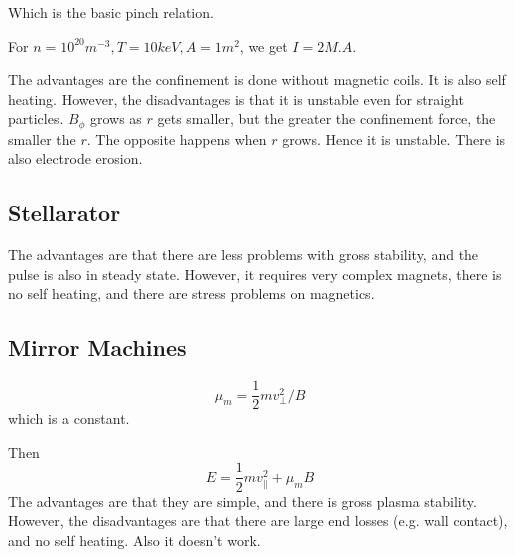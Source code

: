 \documentclass[12pt]{article}
\begin{document}
Which is the basic pinch relation.

\begin{ex}
    For $n = 10^{20}\unit{m^{-3}}, T = 10\unit{keV}, A = 1\unit{m^2}$, we get $I = 2\unit{M.A}$.
\end{ex}

The advantages are the confinement is done without magnetic coils. It is also self heating. However, the disadvantages is that it is unstable even for straight particles. $B_\phi$ grows as $r$ gets smaller, but the greater the confinement force, the smaller the $r$. The opposite happens when $r$ grows. Hence it is unstable. There is also electrode erosion.

\subsection{Stellarator}

The advantages are that there are less problems with gross stability, and the pulse is also in steady state. However, it requires very complex magnets, there is no self heating, and there are stress problems on magnetics.

\subsection{Mirror Machines}

\begin{defn}
    $$\mu_m = \frac{1}{2} mv_\perp^2/B$$
    which is a constant.
\end{defn}
Then
$$E = \frac{1}{2} mv_\parallel^2 + \mu_mB$$
The advantages are that they are simple, and there is gross plasma stability. However, the disadvantages are that there are large end losses (e.g. wall contact), and no self heating. Also it doesn't work.
\end{document}
